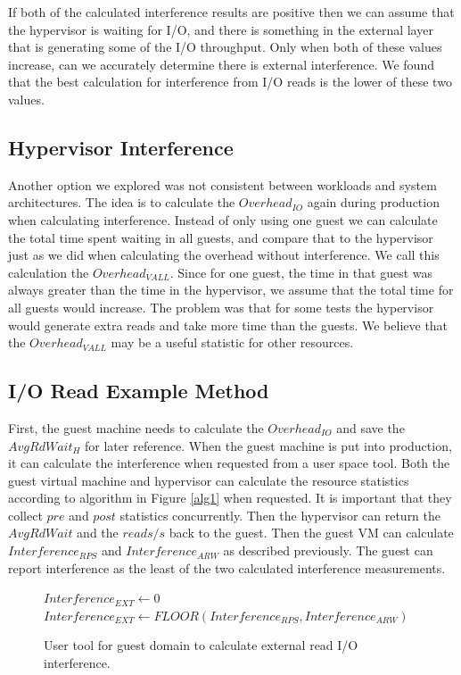 If both of the calculated interference results are positive then we can assume that the hypervisor is waiting for I/O, and there is something in the external layer that is generating some of the I/O throughput.
Only when both of these values increase, can we accurately determine there is external interference.
We found that the best calculation for interference from I/O reads is the lower of these two values.

\subsection{Hypervisor Interference}
Another option we explored was not consistent between workloads and system architectures.  The idea is to calculate the $Overhead_{IO}$ again during production when calculating interference.  Instead of only using one guest we can calculate the total time spent waiting in all guests, and compare that to the hypervisor just as we did when calculating the overhead without interference.  We call this calculation the $Overhead_{VALL}$. Since for one guest, the time in that guest was always greater than the time in the hypervisor, we assume that the total time for all guests would increase.   
The problem was that for some tests the hypervisor would generate extra reads and take more time than the guests.  We believe that the $Overhead_{VALL}$ may be a useful statistic for other resources.

\subsection{I/O Read Example Method}
First, the guest machine needs to calculate the $Overhead_{IO}$ and save the $AvgRdWait_H$ for later reference.  When the guest machine is put into production, it can calculate the interference when requested from a user space tool.  Both the guest virtual machine and hypervisor can calculate the resource statistics according to algorithm in Figure \ref{alg1} when requested.  It is important that they collect $pre$ and $post$ statistics concurrently.  Then the hypervisor can return the $AvgRdWait$ and the $reads/s$ back to the guest.  Then the guest VM can calculate $Interference_{RPS}$ and $Interference_{ARW}$ as described previously.  The guest can report interference as the least of the two calculated interference measurements.

\begin{figure}[h]
\begin{algorithmic}[H]
 \STATE $Interference_{EXT} \gets 0$
 	\STATE $Interference_{EXT} \gets FLOOR(Interference_{RPS}, Interference_{ARW})$  
 \ENDIF
\end{algorithmic}
\label{alg2}
\caption{User tool for guest domain to calculate external read I/O interference.}
\end{figure}

